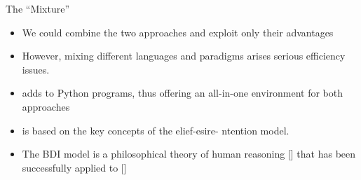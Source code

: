 \begin{frame}{The ``Mixture''}
  \begin{itemize}
\item
We could combine the two approaches and exploit only their advantages 


\item
    However, mixing different languages and paradigms arises serious 
    efficiency issues.
\pause

   \item 
    adds  to Python programs, thus 
    offering an all-in-one environment for both approaches
    \N

\item
     is based on the key concepts of the elief-esire- ntention model.
 
\item 
The BDI model is a philosophical theory of human reasoning 
   [] that has been successfully applied to 
    [] 
   \N
 
    \end{itemize}
\N\N
\end{frame}




